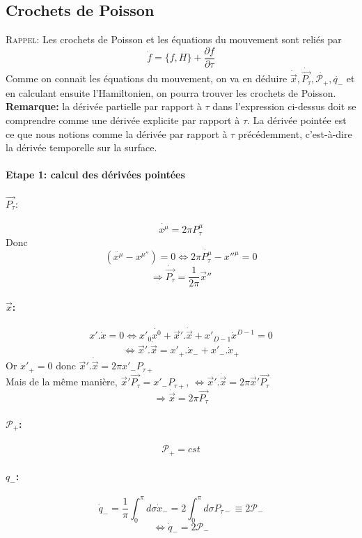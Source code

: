 \documentclass[a4paper,12pt]{article}
\def\xmu{x^\mu}
\def\vecx{\vec{x}}
\def\CP{\mathcal{P}}
\def\pt{P_\tau}
\def\vecpt{\vec{\pt}}
\begin{document}
\subsection{Crochets de Poisson}
\textsc{Rappel:} Les crochets de Poisson et les équations du mouvement sont reliés par 
$$\dot{f}=\{f,H\}+\frac{\partial f}{\partial \tau}$$
Comme on connait les équations du mouvement, on va en déduire $\dot{\vecx}, \dot{\vecpt}, \dot{\CP_+}, \dot{q_-}$  et en calculant ensuite l'Hamiltonien, on pourra trouver les crochets de Poisson.\\
\textbf{Remarque:} la dérivée partielle par rapport à $\tau$ dans l'expression ci-dessus doit se comprendre comme une dérivée explicite par rapport à $\tau$. La dérivée pointée est ce que nous notions comme la dérivée par rapport à $\tau$ précédemment, c'est-à-dire la dérivée temporelle sur la surface.\\
\paragraph*{Etape 1: calcul des dérivées pointées}
\paragraph{$\vecpt:$}$$\dot{\xmu}=2\pi \pt^\mu$$ 
Donc $$\left( \ddot{\xmu}-x^{\mu''} \right)=0 \Leftrightarrow 2\pi\dot{\pt^\mu}-x''^\mu=0$$
$$\Rightarrow \dot{\vecpt}=\frac{1}{2\pi}\vecx''$$
\paragraph{$\vecx$:}
$$x'.\dot{x}=0 \Leftrightarrow x'_0\dot{x^0} + \vecx'.\dot{\vecx} + x'_{D-1}\dot{x}^{D-1}=0$$
$$\Leftrightarrow \vecx'.\dot{\vecx}= x'_+.\dot{x}_- + x'_-.\dot{x}_+$$
Or $x'_+ =0$ donc $\vecx'.\dot{\vecx}=2\pi x'_{-} P_{\tau +}$\\
Mais de la même manière, $\vecx' \vecpt=x'_{-} P_{\tau +} $, $\Leftrightarrow \vecx'.\dot{\vecx}=2\pi \vecx'\vecpt$ $$\Rightarrow \dot{\vecx}=2\pi\vecpt$$
\paragraph{$\CP_+$:}
$$\CP_+= cst$$ 
\paragraph{$q_-$:}
$$\dot{q}_-=\frac{1}{\pi}\int_0^\pi d\sigma \dot{x}_-= 2\int_0^\pi d\sigma P_{\tau -}\equiv 2 \CP_-$$
$$\Leftrightarrow \dot{q}_-=2\CP_-$$
\end{document}
